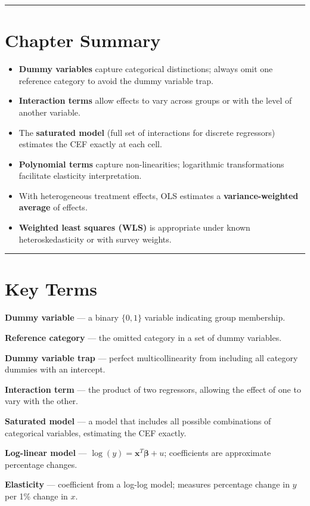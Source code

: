 \medskip\hrule\medskip

\section{Chapter Summary}

\begin{itemize}
\item \textbf{Dummy variables} capture categorical distinctions; always omit one reference category to avoid the dummy variable trap.
\item \textbf{Interaction terms} allow effects to vary across groups or with the level of another variable.
\item The \textbf{saturated model} (full set of interactions for discrete regressors) estimates the CEF exactly at each cell.
\item \textbf{Polynomial terms} capture non-linearities; logarithmic transformations facilitate elasticity interpretation.
\item With heterogeneous treatment effects, OLS estimates a \textbf{variance-weighted average} of effects.
\item \textbf{Weighted least squares (WLS)} is appropriate under known heteroskedasticity or with survey weights.
\end{itemize}

\medskip\hrule\medskip

\section{Key Terms}

\textbf{Dummy variable} --- a binary $\{0,1\}$ variable indicating group membership.

\textbf{Reference category} --- the omitted category in a set of dummy variables.

\textbf{Dummy variable trap} --- perfect multicollinearity from including all category dummies with an intercept.

\textbf{Interaction term} --- the product of two regressors, allowing the effect of one to vary with the other.

\textbf{Saturated model} --- a model that includes all possible combinations of categorical variables, estimating the CEF exactly.

\textbf{Log-linear model} --- $\log(y) = \mathbf{x}^T\boldsymbol{\beta} + u$; coefficients are approximate percentage changes.

\textbf{Elasticity} --- coefficient from a log-log model; measures percentage change in $y$ per 1\% change in $x$.

